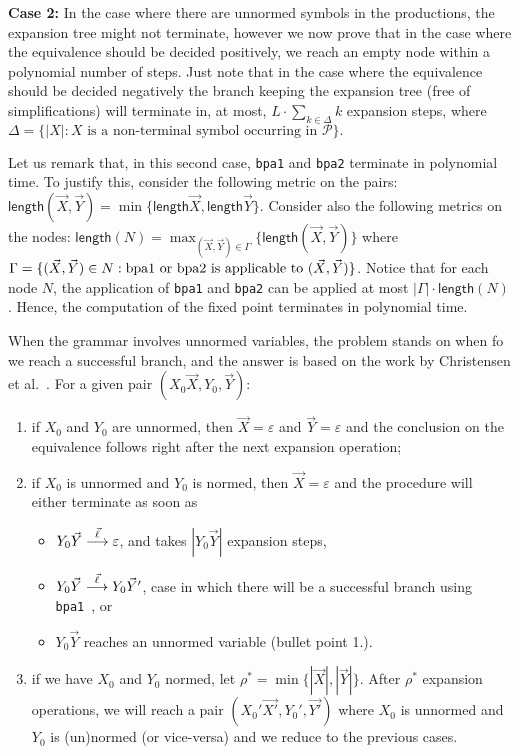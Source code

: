 \noindent\textbf{Case 2:} In the case where there are unnormed symbols
in the productions, the expansion tree might not terminate, however
we now prove that in the case where the equivalence should be decided
positively, we reach an empty node within a polynomial number of steps.
Just note that in the case where the equivalence should be decided negatively
the branch keeping the expansion tree (free of simplifications) will
terminate in, at most, $L\cdot \sum_{k\in\Delta} k$ expansion steps, 
where $\Delta = \{|X| : X \text{ is a non-terminal symbol 
occurring in }\mathcal{P}\}.$

Let us remark that, in this second case, \lstinline{bpa1} and 
\lstinline{bpa2} terminate in polynomial time. 
To justify this, consider the following
metric on the pairs: $\mathsf{length}(\vec X, \vec Y) = 
\min \{\mathsf{length} \vec X, \mathsf{length} \vec Y\}.$ 
Consider also the following metrics on the nodes:
$\mathsf{length}(N) = \max_{(\vec X, \vec Y)\in \Gamma} 
\{\mathsf{length}(\vec X, \vec Y)\}$
where $\Gamma=\{(\vec X,\vec Y)\in N : \text{\lstinline{bpa1} or  
\lstinline{bpa2} is applicable to }(\vec X,\vec Y) \}$. 
Notice that for each node $N$, the application
of \lstinline{bpa1} and \lstinline{bpa2} can be applied at most
$|\Gamma|\cdot\mathsf{length}(N)$. Hence, the computation
of the fixed point terminates in polynomial time. 
 
When the grammar involves unnormed variables, the problem
stands on when fo we reach a successful branch, and the
answer is based on the work by Christensen et 
al.~\cite{DBLP:journals/iandc/ChristensenHS95}.
For a given pair $(X_0\vec X, Y_0,\vec Y)$:
\begin{enumerate}
	\item if $X_0$ and $Y_0$ are unnormed, then $\vec X = \varepsilon$
		  and $\vec Y = \varepsilon$ and the conclusion on the equivalence
		  follows right after the next expansion operation;
	\item if $X_0$ is unnormed and $Y_0$ is normed, then $\vec X = \varepsilon$
		  and the procedure will either terminate as soon as
		  \begin{itemize}
		  	\item $Y_0\vec Y\LTSderives[\vec\ell] \varepsilon$, and takes 
		  		  $|Y_0\vec Y|$ expansion steps,
		  	\item $Y_0\vec Y\LTSderives[\vec\ell] Y_0\vec Y'$, case in which
		  		  there will be a successful branch using 
		  		  \lstinline{bpa1}~\cite{DBLP:journals/iandc/ChristensenHS95}, or
		  	\item $Y_0\vec Y$ reaches an unnormed variable (bullet point 1.).
		  \end{itemize}
	\item if we have $X_0$ and $Y_0$ normed, let 
		  $\rho^* = \min \{|\vec X|, |\vec Y|\}$. After $\rho^*$ expansion
		  operations, we will reach a pair $(X_0'\vec{X'}, Y_0',\vec{Y'})$
		  where $X_0$ is unnormed and $Y_0$ is (un)normed (or vice-versa)
		  and we reduce to the previous cases.
\end{enumerate}

